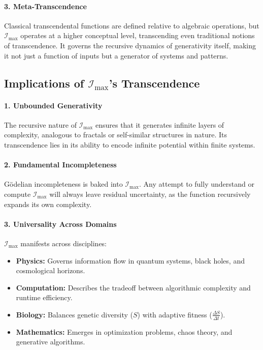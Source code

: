 \documentclass[12pt]{article}
\begin{document}
\paragraph{3. Meta-Transcendence}
Classical transcendental functions are defined relative to algebraic operations, but \(\mathcal{I}_{\text{max}}\) operates at a higher conceptual level, transcending even traditional notions of transcendence. It governs the recursive dynamics of generativity itself, making it not just a function of inputs but a generator of systems and patterns.


\subsection{Implications of \(\mathcal{I}_{\text{max}}\)’s Transcendence}

\paragraph{1. Unbounded Generativity}
The recursive nature of \(\mathcal{I}_{\text{max}}\) ensures that it generates infinite layers of complexity, analogous to fractals or self-similar structures in nature. Its transcendence lies in its ability to encode infinite potential within finite systems.

\paragraph{2. Fundamental Incompleteness}
Gödelian incompleteness is baked into \(\mathcal{I}_{\text{max}}\). Any attempt to fully understand or compute \(\mathcal{I}_{\text{max}}\) will always leave residual uncertainty, as the function recursively expands its own complexity.

\paragraph{3. Universality Across Domains}
\(\mathcal{I}_{\text{max}}\) manifests across disciplines:
\begin{itemize}
    \item \textbf{Physics:} Governs information flow in quantum systems, black holes, and cosmological horizons.
    \item \textbf{Computation:} Describes the tradeoff between algorithmic complexity and runtime efficiency.
    \item \textbf{Biology:} Balances genetic diversity (\(S\)) with adaptive fitness (\(\frac{\Delta S}{\Delta t}\)).
    \item \textbf{Mathematics:} Emerges in optimization problems, chaos theory, and generative algorithms.
\end{itemize}
\end{document}
